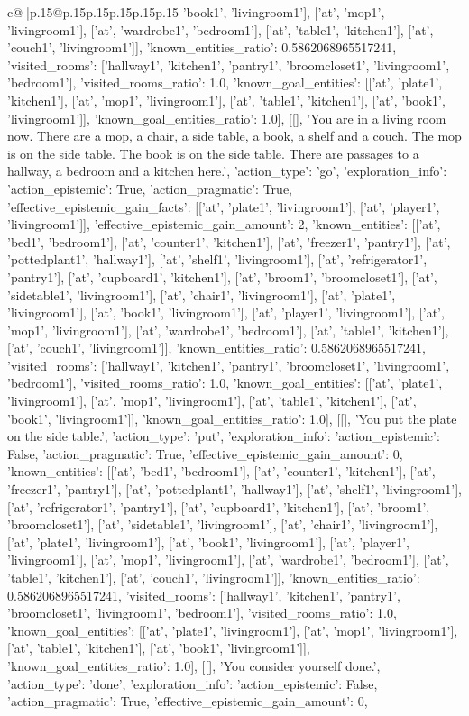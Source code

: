 \documentclass{article}
\begin{document}
{\begin{supertabular}{c@{$\;$}|p{.15\linewidth}@{}p{.15\linewidth}p{.15\linewidth}p{.15\linewidth}p{.15\linewidth}p{.15\linewidth}}
{{{'book1', 'livingroom1'], ['at', 'mop1', 'livingroom1'], ['at', 'wardrobe1', 'bedroom1'], ['at', 'table1', 'kitchen1'], ['at', 'couch1', 'livingroom1']], 'known_entities_ratio': 0.5862068965517241, 'visited_rooms': ['hallway1', 'kitchen1', 'pantry1', 'broomcloset1', 'livingroom1', 'bedroom1'], 'visited_rooms_ratio': 1.0, 'known_goal_entities': [['at', 'plate1', 'kitchen1'], ['at', 'mop1', 'livingroom1'], ['at', 'table1', 'kitchen1'], ['at', 'book1', 'livingroom1']], 'known_goal_entities_ratio': 1.0}}], [[], 'You are in a living room now. There are a mop, a chair, a side table, a book, a shelf and a couch. The mop is on the side table. The book is on the side table. There are passages to a hallway, a bedroom and a kitchen here.', {'action_type': 'go', 'exploration_info': {'action_epistemic': True, 'action_pragmatic': True, 'effective_epistemic_gain_facts': [['at', 'plate1', 'livingroom1'], ['at', 'player1', 'livingroom1']], 'effective_epistemic_gain_amount': 2, 'known_entities': [['at', 'bed1', 'bedroom1'], ['at', 'counter1', 'kitchen1'], ['at', 'freezer1', 'pantry1'], ['at', 'pottedplant1', 'hallway1'], ['at', 'shelf1', 'livingroom1'], ['at', 'refrigerator1', 'pantry1'], ['at', 'cupboard1', 'kitchen1'], ['at', 'broom1', 'broomcloset1'], ['at', 'sidetable1', 'livingroom1'], ['at', 'chair1', 'livingroom1'], ['at', 'plate1', 'livingroom1'], ['at', 'book1', 'livingroom1'], ['at', 'player1', 'livingroom1'], ['at', 'mop1', 'livingroom1'], ['at', 'wardrobe1', 'bedroom1'], ['at', 'table1', 'kitchen1'], ['at', 'couch1', 'livingroom1']], 'known_entities_ratio': 0.5862068965517241, 'visited_rooms': ['hallway1', 'kitchen1', 'pantry1', 'broomcloset1', 'livingroom1', 'bedroom1'], 'visited_rooms_ratio': 1.0, 'known_goal_entities': [['at', 'plate1', 'livingroom1'], ['at', 'mop1', 'livingroom1'], ['at', 'table1', 'kitchen1'], ['at', 'book1', 'livingroom1']], 'known_goal_entities_ratio': 1.0}}], [[], 'You put the plate on the side table.', {'action_type': 'put', 'exploration_info': {'action_epistemic': False, 'action_pragmatic': True, 'effective_epistemic_gain_amount': 0, 'known_entities': [['at', 'bed1', 'bedroom1'], ['at', 'counter1', 'kitchen1'], ['at', 'freezer1', 'pantry1'], ['at', 'pottedplant1', 'hallway1'], ['at', 'shelf1', 'livingroom1'], ['at', 'refrigerator1', 'pantry1'], ['at', 'cupboard1', 'kitchen1'], ['at', 'broom1', 'broomcloset1'], ['at', 'sidetable1', 'livingroom1'], ['at', 'chair1', 'livingroom1'], ['at', 'plate1', 'livingroom1'], ['at', 'book1', 'livingroom1'], ['at', 'player1', 'livingroom1'], ['at', 'mop1', 'livingroom1'], ['at', 'wardrobe1', 'bedroom1'], ['at', 'table1', 'kitchen1'], ['at', 'couch1', 'livingroom1']], 'known_entities_ratio': 0.5862068965517241, 'visited_rooms': ['hallway1', 'kitchen1', 'pantry1', 'broomcloset1', 'livingroom1', 'bedroom1'], 'visited_rooms_ratio': 1.0, 'known_goal_entities': [['at', 'plate1', 'livingroom1'], ['at', 'mop1', 'livingroom1'], ['at', 'table1', 'kitchen1'], ['at', 'book1', 'livingroom1']], 'known_goal_entities_ratio': 1.0}}], [[], 'You consider yourself done.', {'action_type': 'done', 'exploration_info': {'action_epistemic': False, 'action_pragmatic': True, 'effective_epistemic_gain_amount': 0, }}}
\end{supertabular}}
\end{document}
